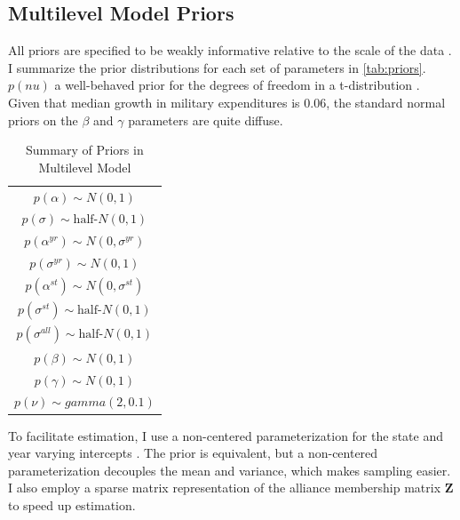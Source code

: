 \documentclass[12pt]{article}
\begin{document}
\subsection{Multilevel Model Priors} 

All priors are specified to be weakly informative relative to the scale of the data \citep{Gelmanetal2017}. 
I summarize the prior distributions for each set of parameters in \autoref{tab:priors}. 
$p(nu)$ a well-behaved prior for the degrees of freedom in a t-distribution \citep{JuarezSteele2010}. 
Given that median growth in military expenditures is 0.06, the standard normal priors on the $\beta$ and $\gamma$ parameters are quite diffuse. 


\begin{table} %
\begin{center}
\begin{tabular}{c} 
$ p(\alpha) \sim N(0, 1)$  \\
$ p(\sigma) \sim \mbox{half-}N(0, 1) $ \\
$ p(\alpha^{yr}) \sim N(0, \sigma^{yr}) $ \\ 
$ p(\sigma^{yr}) \sim N(0, 1) $ \\
$ p(\alpha^{st}) \sim N(0, \sigma^{st}) $ \\ 
$ p(\sigma^{st}) \sim \mbox{half-}N(0, 1) $ \\ 
$ p(\sigma^{all}) \sim \mbox{half-}N(0, 1) $ \\
$ p(\beta) \sim N(0, 1) $ \\
$ p(\gamma) \sim N(0, 1) $ \\ 
$ p(\nu) \sim gamma(2, 0.1)$ 
\end{tabular} 
\caption{Summary of Priors in Multilevel Model} 
\label{tab:priors}
\end{center} 
\end{table} 


To facilitate estimation, I use a non-centered parameterization for the state and year varying intercepts \citep{BetancourtGirolani2015}. 
The prior is equivalent, but a non-centered parameterization decouples the mean and variance, which makes sampling easier. 
I also employ a sparse matrix representation of the alliance membership matrix $\textbf{Z}$ to speed up estimation. 


\singlespace


 
\end{document}

